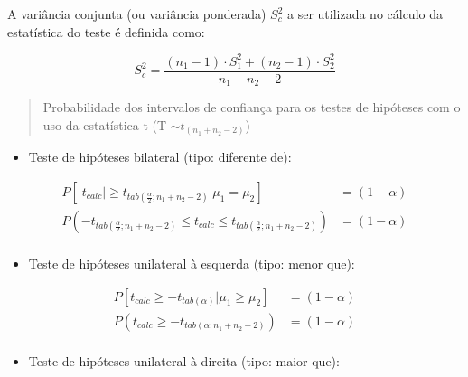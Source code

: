\documentclass[
]{book}
\providecommand{\tightlist}{%
  \setlength{\itemsep}{0pt}\setlength{\parskip}{0pt}}
\begin{document}
\hfill\break

A variância conjunta (ou variância ponderada) \(S_{c}^{2}\) a ser utilizada no cálculo da estatística do teste é definida como:

\hfill\break

\[
S_{c}^{2} =  \frac{\left({n}_{1}-1\right)\cdot {S}_{1}^{2}+\left({n}_{2}-1\right)\cdot {S}_{2}^{2}}{{n}_{1}+{n}_{2}-2}
\]

\hfill\break

\begin{quote}
Probabilidade dos intervalos de confiança para os testes de hipóteses com o uso da estatística t (T \(\sim t_{(n_{1} + n_{2} - 2)}\))
\end{quote}

\hfill\break

\begin{itemize}
\tightlist
\item
  Teste de hipóteses bilateral (tipo: diferente de):
\end{itemize}

\begin{align*}
P[\left|t_{calc}\right| \ge  {t}_{tab\left(\frac{\alpha }{2};{n}_{1}+{n}_{2}-2\right)}|\mu_{1}=\mu_{2}] & =(1-\alpha) \\
P(-  {t}_{tab\left(\frac{\alpha }{2};{n}_{1}+{n}_{2}-2\right)} \le t_{calc}  \le  {t}_{tab\left(\frac{\alpha }{2};{n}_{1}+{n}_{2}-2\right)}) & =(1-\alpha)\\
\end{align*}

\hfill\break

\begin{itemize}
\tightlist
\item
  Teste de hipóteses unilateral à esquerda (tipo: menor que):
\end{itemize}

\hfill\break

\begin{align*}
P[t_{calc} \ge -{t}_{tab\left(\alpha \right)}|\mu_{1} \ge \mu_{2}] & = (1-\alpha) \\  
P( t_{calc}  \ge -{t}_{tab\left(\alpha;{n}_{1}+{n}_{2}-2\right)} ) & = (1-\alpha) \\ 
\end{align*}

\hfill\break

\begin{itemize}
\tightlist
\item
  Teste de hipóteses unilateral à direita (tipo: maior que):
\end{itemize}
\end{document}
